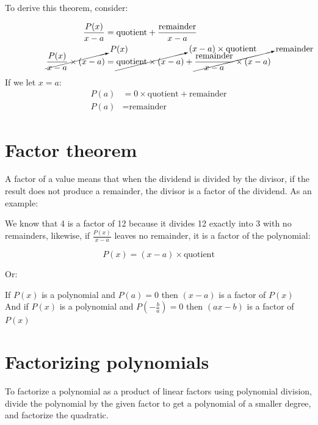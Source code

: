 \documentclass{book}
\begin{document}
To derive this theorem, consider:

\begin{center}
	\begin{align*}
		\frac{P(x)}{x - a}                                 & = \text{quotient} + \frac{\text{remainder}}{x - a}                                                                                                       \\
		\cancelto{P(x)}{\frac{P(x)}{x - a} \times (x - a)} & = \cancelto{(x - a) \times \text{quotient}}{\text{quotient} \times (x - a)} + \cancelto{\text{remainder}}{\frac{\text{remainder}}{x - a} \times (x - a)}
	\end{align*}
	If we let $x = a$:
	\begin{align*}
		P(a) & = 0 \times \text{quotient} + \text{remainder} \\
		P(a) & = \text{remainder}
	\end{align*}
\end{center}

\section{Factor theorem}
A factor of a value means that when the dividend is divided by the divisor, if the result does not produce a remainder, the divisor is a factor of the dividend.  As an example:

We know that 4 is a factor of 12 because it divides 12 exactly into 3 with no remainders, likewise, if $\frac{P(x)}{x - a}$ leaves no remainder, it is a factor of the polynomial:

\[
	P(x) = (x - a) \times \text{quotient}
\]

Or:

\begin{center}
	If $P(x)$ is a polynomial and $P(a) = 0$ then $(x - a)$ is a factor of $P(x)$\\
	And if $P(x)$ is a polynomial and $P(-\frac{b}{a}) = 0$ then $(ax - b)$ is a factor of $P(x)$
\end{center}



\section{Factorizing polynomials}
To factorize a polynomial as a product of linear factors using polynomial division, divide the polynomial by the given factor to get a polynomial of a smaller degree, and factorize the quadratic.
\end{document}
